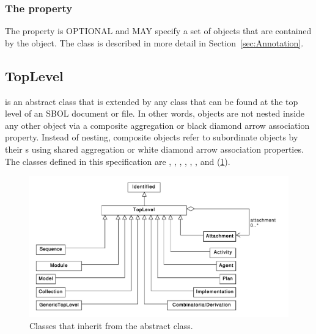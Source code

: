 \subsubsection*{The  property}
\label{sec:annotations}

The  property is OPTIONAL and MAY specify a set of  objects that are contained by the  object. The  class is described in more detail in Section~\ref{sec:Annotation}.

\subsection {TopLevel}
\label{sec:TopLevel}
 is an abstract class that is extended by any  class that can be found at the top level of an SBOL document or file. In other words,  objects are not nested inside any other object via a composite aggregation or black diamond arrow association property. Instead of nesting, composite  objects refer to subordinate  objects by their s using shared aggregation or white diamond arrow association properties. The  classes defined in this specification are , , , , , , and (\ref{uml:toplevel}).


\begin{figure}[ht]
\begin{center}
\includegraphics[width=\textwidth]{uml/toplevel}
\caption[]{Classes that inherit from the  abstract class.}
\label{uml:toplevel}
\end{center}
\end{figure}


